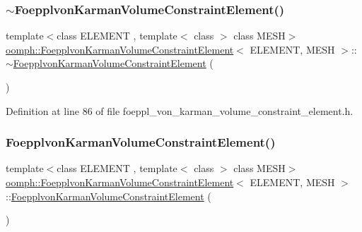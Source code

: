 \subsubsection{\texorpdfstring{$\sim$\+Foepplvon\+Karman\+Volume\+Constraint\+Element()}{~FoepplvonKarmanVolumeConstraintElement()}}
{\footnotesize\ttfamily template$<$class E\+L\+E\+M\+E\+NT , template$<$ class $>$ class M\+E\+SH$>$ \\
\hyperlink{classoomph_1_1FoepplvonKarmanVolumeConstraintElement}{oomph\+::\+Foepplvon\+Karman\+Volume\+Constraint\+Element}$<$ E\+L\+E\+M\+E\+NT, M\+E\+SH $>$\+::$\sim$\hyperlink{classoomph_1_1FoepplvonKarmanVolumeConstraintElement}{Foepplvon\+Karman\+Volume\+Constraint\+Element} (\begin{DoxyParamCaption}{ }\end{DoxyParamCaption})\hspace{0.3cm}{\ttfamily [inline]}}



Definition at line 86 of file foeppl\+\_\+von\+\_\+karman\+\_\+volume\+\_\+constraint\+\_\+element.\+h.

\mbox{\label{classoomph_1_1FoepplvonKarmanVolumeConstraintElement_ad429fa00b4af95528c141a0ee95884f1}} 
\subsubsection{\texorpdfstring{Foepplvon\+Karman\+Volume\+Constraint\+Element()}{FoepplvonKarmanVolumeConstraintElement()}\hspace{0.1cm}{\footnotesize\ttfamily [2/2]}}
{\footnotesize\ttfamily template$<$class E\+L\+E\+M\+E\+NT , template$<$ class $>$ class M\+E\+SH$>$ \\
\hyperlink{classoomph_1_1FoepplvonKarmanVolumeConstraintElement}{oomph\+::\+Foepplvon\+Karman\+Volume\+Constraint\+Element}$<$ E\+L\+E\+M\+E\+NT, M\+E\+SH $>$\+::\hyperlink{classoomph_1_1FoepplvonKarmanVolumeConstraintElement}{Foepplvon\+Karman\+Volume\+Constraint\+Element} (\begin{DoxyParamCaption}\item[{const \hyperlink{classoomph_1_1FoepplvonKarmanVolumeConstraintElement}{Foepplvon\+Karman\+Volume\+Constraint\+Element}$<$ E\+L\+E\+M\+E\+NT, M\+E\+SH $>$ \&}]{ }\end{DoxyParamCaption})\hspace{0.3cm}{\ttfamily [inline]}}



